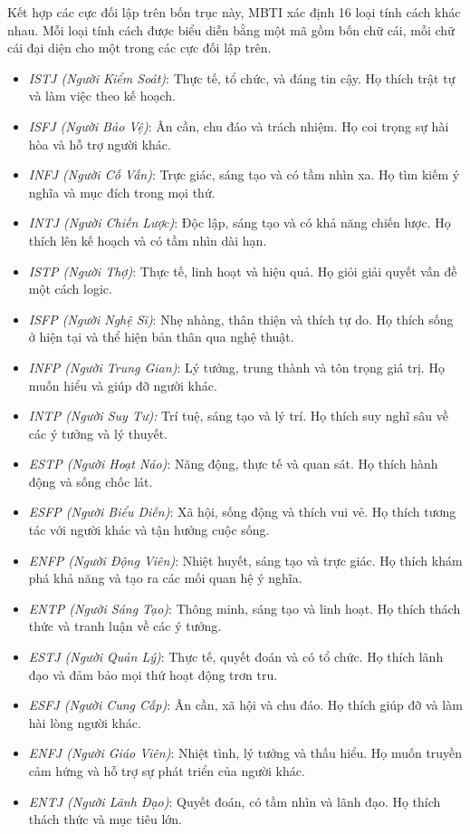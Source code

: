 Kết hợp các cực đối lập trên bốn trục này, MBTI xác định 16 loại tính cách khác nhau. Mỗi loại tính cách được biểu diễn bằng một mã gồm bốn chữ cái, mỗi chữ cái đại diện cho một trong các cực đối lập trên. 
\begin{itemize}
    \item \textit{ISTJ (Người Kiểm Soát)}: Thực tế, tổ chức, và đáng tin cậy. Họ thích trật tự và làm việc theo kế hoạch.
\item \textit{ISFJ (Người Bảo Vệ)}:  Ân cần, chu đáo và trách nhiệm. Họ coi trọng sự hài hòa và hỗ trợ người khác.
\item \textit{INFJ (Người Cố Vấn)}: Trực giác, sáng tạo và có tầm nhìn xa. Họ tìm kiếm ý nghĩa và mục đích trong mọi thứ.
\item \textit{INTJ (Người Chiến Lược)}: Độc lập, sáng tạo và có khả năng chiến lược. Họ thích lên kế hoạch và có tầm nhìn dài hạn.
\item \textit{ISTP (Người Thợ)}: Thực tế, linh hoạt và hiệu quả. Họ giỏi giải quyết vấn đề một cách logic.
\item \textit{ISFP (Người Nghệ Sĩ)}: Nhẹ nhàng, thân thiện và thích tự do. Họ thích sống ở hiện tại và thể hiện bản thân qua nghệ thuật.
\item \textit{INFP (Người Trung Gian)}: Lý tưởng, trung thành và tôn trọng giá trị. Họ muốn hiểu và giúp đỡ người khác.
\item \textit{INTP (Người Suy Tư):} Trí tuệ, sáng tạo và lý trí. Họ thích suy nghĩ sâu về các ý tưởng và lý thuyết.
\item \textit{ESTP (Người Hoạt Náo)}: Năng động, thực tế và quan sát. Họ thích hành động và sống chốc lát.
\item \textit{ESFP (Người Biểu Diễn)}: Xã hội, sống động và thích vui vẻ. Họ thích tương tác với người khác và tận hưởng cuộc sống.
\item \textit{ENFP (Người Động Viên)}: Nhiệt huyết, sáng tạo và trực giác. Họ thích khám phá khả năng và tạo ra các mối quan hệ ý nghĩa.
\item \textit{ENTP (Người Sáng Tạo)}: Thông minh, sáng tạo và linh hoạt. Họ thích thách thức và tranh luận về các ý tưởng.
\item \textit{ESTJ (Người Quản Lý)}: Thực tế, quyết đoán và có tổ chức. Họ thích lãnh đạo và đảm bảo mọi thứ hoạt động trơn tru.
\item \textit{ESFJ (Người Cung Cấp)}:  Ân cần, xã hội và chu đáo. Họ thích giúp đỡ và làm hài lòng người khác.
\item \textit{ENFJ (Người Giáo Viên)}: Nhiệt tình, lý tưởng và thấu hiểu. Họ muốn truyền cảm hứng và hỗ trợ sự phát triển của người khác.
\item \textit{ENTJ (Người Lãnh Đạo)}: Quyết đoán, có tầm nhìn và lãnh đạo. Họ thích thách thức và mục tiêu lớn.
\end{itemize}

